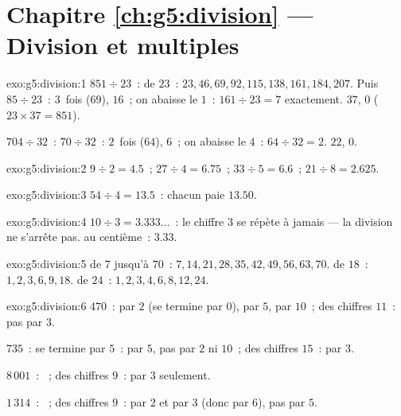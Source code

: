 \section*{Chapitre \ref{ch:g5:division} --- Division et multiples}

\begin{solution}{exo:g5:division:1}
$851 \div 23$~:  de $23$~: $23, 46, 69, 92, 115, 138, 161,
184, 207$. Puis $85 \div 23$~: $3$~fois ($69$),  $16$~; on
abaisse le $1$~: $161 \div 23 = 7$ exactement.  $37$, 
$0$ ($23 \times 37 = 851$).

$704 \div 32$~: $70 \div 32$~: $2$~fois ($64$),  $6$~; on
abaisse le $4$~: $64 \div 32 = 2$.  $22$,  $0$.
\end{solution}

\begin{solution}{exo:g5:division:2}
$9 \div 2 = 4.5$~; \quad $27 \div 4 = 6.75$~; \quad
$33 \div 5 = 6.6$~; \quad $21 \div 8 = 2.625$.
\end{solution}

\begin{solution}{exo:g5:division:3}
$54 \div 4 = 13.5$~: chacun paie $13.50$.
\end{solution}

\begin{solution}{exo:g5:division:4}
$10 \div 3 = 3.333\dots$~: le chiffre $3$ se répète à jamais --- la
division ne s'arrête pas.  au centième~: $3.33$.
\end{solution}

\begin{solution}{exo:g5:division:5}
 de $7$ jusqu'à $70$~: $7, 14, 21, 28, 35, 42, 49, 56, 63,
70$.  de $18$~: $1, 2, 3, 6, 9, 18$.  de $24$~:
$1, 2, 3, 4, 6, 8, 12, 24$.
\end{solution}

\begin{solution}{exo:g5:division:6}
$470$~: par $2$ (se termine par $0$), par $5$, par $10$~;  des
chiffres $11$~: pas par $3$.

$735$~: se termine par $5$~: par $5$, pas par $2$ ni $10$~; 
des chiffres $15$~: par $3$.

$8\,001$~: ~;  des chiffres $9$~: par $3$ seulement.

$1\,314$~: ~;  des chiffres $9$~: par $2$ et par $3$ (donc
par $6$), pas par $5$.
\end{solution}

